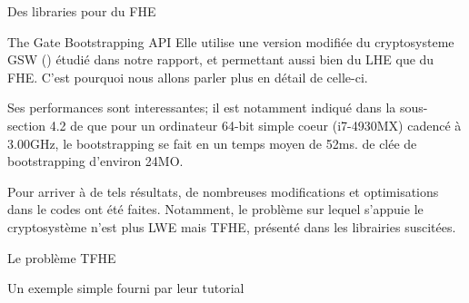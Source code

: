 \begin{section}{Des libraries pour du FHE}
\begin{subsection}{The Gate Bootstrapping API}
Elle utilise une version modifiée du cryptosysteme GSW (\cite{C:GenSahWat13})
étudié dans notre rapport, et permettant aussi bien du LHE que du FHE. C'est
pourquoi nous allons parler plus en détail de celle-ci.

Ses performances sont interessantes; il est notamment indiqué dans la sous-section
4.2 de \cite{cryptoeprint:2016:870} que pour un ordinateur 64-bit simple coeur 
(i7-4930MX) cadencé à 3.00GHz, le bootstrapping se fait en un temps moyen de 52ms.
de clée de bootstrapping d'environ 24MO.

Pour arriver à de tels résultats, de nombreuses modifications et optimisations dans le codes 
ont été faites. Notamment, le problème sur lequel s'appuie le cryptosystème n'est plus 
LWE mais TFHE, présenté dans les librairies suscitées.

\begin{subsubsection}{Le problème TFHE}
\end{subsubsection} %
\begin{subsubsection}{Un exemple simple fourni par leur tutorial}
\end{subsubsection} %
\end{subsection} %
\end{section}
